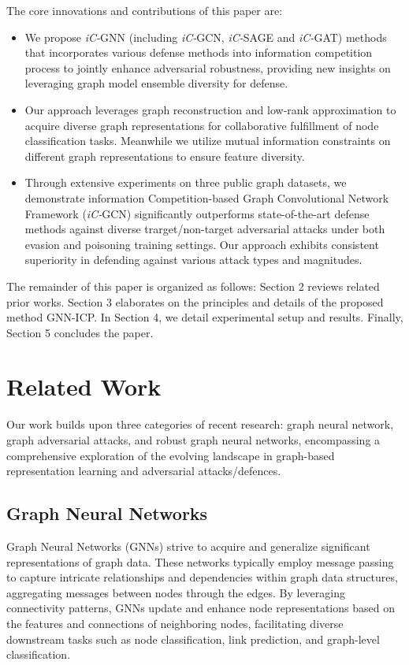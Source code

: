 \documentclass[conference]{IEEEtran}
\begin{document}
The core innovations and contributions of this paper are:
\begin{itemize}
    \item We propose \textit{iC-}GNN (including \textit{iC-}GCN, \textit{iC-}SAGE and \textit{iC-}GAT) methods that incorporates various defense methods into information competition process to jointly enhance adversarial robustness, providing new insights on leveraging graph model ensemble diversity for defense.
    \item Our approach leverages graph reconstruction and low-rank approximation to acquire diverse graph representations for collaborative fulfillment of node classification tasks. Meanwhile we utilize mutual information constraints on different graph representations to ensure feature diversity.
    \item Through extensive experiments on three public graph datasets, we demonstrate information Competition-based Graph Convolutional Network Framework (\textit{iC-}GCN) significantly outperforms state-of-the-art defense methods against diverse trarget/non-target adversarial attacks under both evasion and poisoning training settings. Our approach exhibits consistent superiority in defending against various attack types and magnitudes.  
\end{itemize}

The remainder of this paper is organized as follows: Section 2 reviews related prior works. Section 3 elaborates on the principles and details of the proposed method GNN-ICP. In Section 4, we detail experimental setup and results. Finally, Section 5 concludes the paper.



\section{Related Work}

Our work builds upon three categories of recent research: graph neural network, graph adversarial attacks, and robust graph neural networks, encompassing a comprehensive exploration of the evolving landscape in graph-based representation learning and adversarial attacks/defences.

\subsection{Graph Neural Networks}

Graph Neural Networks (GNNs)\cite{Zhou2018GraphNN} strive to acquire and generalize significant representations of graph data. These networks typically employ message passing to capture intricate relationships and dependencies within graph data structures, aggregating messages between nodes through the edges. By leveraging connectivity patterns, GNNs update and enhance node representations based on the features and connections of neighboring nodes, facilitating diverse downstream tasks such as node classification, link prediction, and graph-level classification.
\end{document}
